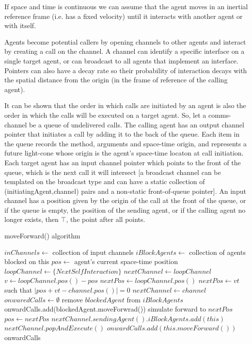 \documentclass[a4paper]{article}
\begin{document}
If space and time is continuous we can assume that the agent moves in an inertial reference frame (i.e. has a fixed velocity) until it interacts with another agent or with itself.

Agents become potential callers by opening channels to other agents and interact by creating a call on the channel. A channel can identify a specific interface on a single target agent, or can broadcast to all agents that implement an interface. Pointers can also have a decay rate so their probability of interaction decays with the spatial distance from the origin (in the frame of reference of the calling agent).

It can be shown that the order in which calls are initiated by an agent is also the order in which the calls will be executed on a target agent. So, let a comms-channel be a queue of undelivered calls. The calling agent has an output channel pointer that initiates a call by adding it to the back of the queue. Each item in the queue records the method, arguments and space-time origin, and represents a future light-cone whose origin is the agent's space-time locaton at call initiation. Each target agent has an input channel pointer which points to the front of the queue, which is the next call it will intersect [a broadcast channel can be templated on the broadcast type and can have a static collection of (initiatingAgent,channel) pairs and a non-static front-of-queue pointer]. An input channel has a position given by the origin of the call at the front of the queue, or if the queue is empty, the position of the sending agent, or if the calling agent no longer exists, then $\top$, the point after all points.

\begin{algorithm}
	\caption{moveForward() algorithm}
\begin{algorithmic}
	\STATE $inChannels \gets $ collection of input channels
	\STATE $iBlockAgents \gets $ collection of agents blocked on this
	\STATE $pos \gets $ agent's current space-time position
	\STATE $loopChannel \gets \{NextSelfInteraction\}$
	\STATE $nextChannel \gets loopChannel$
	\STATE $v \gets loopChannel.pos() - pos$ 
	\STATE $nextPos \gets loopChannel.pos()$ 
			\STATE $nextPos \gets vt$ such that $|pos + vt - channel.pos()| = 0$ 
			\STATE $nextChannel \gets channel$ 
		\ENDIF
	\ENDFOR
	\STATE $onwaredCalls \gets \emptyset$
			\STATE remove $blockedAgent$ from $iBlockAgents$
			\STATE onwardCalls.add(blockedAgent.moveForwrad())
		\ENDIF
	\ENDFOR
	\STATE simulate forward to $nextPos$
	\STATE $pos \gets nextPos$
		\STATE $nextChannel.sendingAgent().iBlockAgents.add(this)$
	\ELSE
		\STATE $nextChannel.popAndExecute()$
		\STATE $onwardCalls.add(this.moveForward())$
	\ENDIF
	\RETURN onwardCalls
\end{algorithmic}
\end{algorithm}
\end{document}
